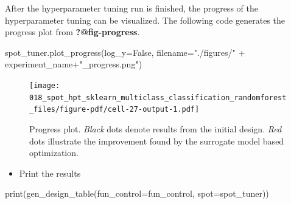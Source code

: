 \documentclass[
  letterpaper,
  DIV=11,
  numbers=noendperiod]{scrreprt}
\newenvironment{Shaded}{\begin{snugshade}}{\end{snugshade}}
\newcommand{\BuiltInTok}[1]{\textcolor[rgb]{0.00,0.23,0.31}{#1}}
\newcommand{\NormalTok}[1]{\textcolor[rgb]{0.00,0.23,0.31}{#1}}
\newcommand{\OperatorTok}[1]{\textcolor[rgb]{0.37,0.37,0.37}{#1}}
\newcommand{\StringTok}[1]{\textcolor[rgb]{0.13,0.47,0.30}{#1}}
\newcommand{\VariableTok}[1]{\textcolor[rgb]{0.07,0.07,0.07}{#1}}
\providecommand{\tightlist}{%
  \setlength{\itemsep}{0pt}\setlength{\parskip}{0pt}}\usepackage{longtable,booktabs,array}
\begin{document}
After the hyperparameter tuning run is finished, the progress of the
hyperparameter tuning can be visualized. The following code generates
the progress plot from \textbf{?@fig-progress}.

\begin{Shaded}
\begin{Highlighting}[]
\NormalTok{spot\_tuner.plot\_progress(log\_y}\OperatorTok{=}\VariableTok{False}\NormalTok{,}
\NormalTok{    filename}\OperatorTok{=}\StringTok{"./figures/"} \OperatorTok{+}\NormalTok{ experiment\_name}\OperatorTok{+}\StringTok{"\_progress.png"}\NormalTok{)}
\end{Highlighting}
\end{Shaded}

\begin{figure}[H]

{\centering \texttt{[image: 018\_spot\_hpt\_sklearn\_multiclass\_classification\_randomforest\_files/figure-pdf/cell-27-output-1.pdf]}

}

\caption{Progress plot. \emph{Black} dots denote results from the
initial design. \emph{Red} dots illustrate the improvement found by the
surrogate model based optimization.}

\end{figure}

\begin{itemize}
\tightlist
\item
  Print the results
\end{itemize}

\begin{Shaded}
\begin{Highlighting}[]
\BuiltInTok{print}\NormalTok{(gen\_design\_table(fun\_control}\OperatorTok{=}\NormalTok{fun\_control,}
\NormalTok{    spot}\OperatorTok{=}\NormalTok{spot\_tuner))}
\end{Highlighting}
\end{Shaded}
\end{document}
